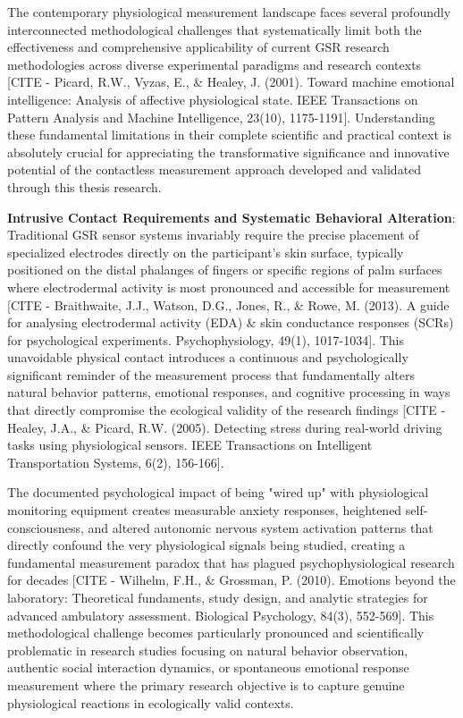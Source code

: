 \documentclass[11pt,a4paper]{report}
\begin{document}
The contemporary physiological measurement landscape faces several profoundly interconnected methodological challenges
that systematically limit both the effectiveness and comprehensive applicability of current GSR research methodologies
across diverse experimental paradigms and research
contexts [CITE - Picard, R.W., Vyzas, E., \& Healey, J. (2001). Toward machine emotional intelligence: Analysis of affective physiological state. IEEE Transactions on Pattern Analysis and Machine Intelligence, 23(10), 1175-1191].
Understanding these fundamental limitations in their complete scientific and practical context is absolutely crucial for
appreciating the transformative significance and innovative potential of the contactless measurement approach developed
and validated through this thesis research.

\textbf{Intrusive Contact Requirements and Systematic Behavioral Alteration}: Traditional GSR sensor systems invariably
require the precise placement of specialized electrodes directly on the participant's skin surface, typically positioned
on the distal phalanges of fingers or specific regions of palm surfaces where electrodermal activity is most pronounced
and accessible for
measurement [CITE - Braithwaite, J.J., Watson, D.G., Jones, R., \& Rowe, M. (2013). A guide for analysing electrodermal activity (EDA) \& skin conductance responses (SCRs) for psychological experiments. Psychophysiology, 49(1), 1017-1034].
This unavoidable physical contact introduces a continuous and psychologically significant reminder of the measurement
process that fundamentally alters natural behavior patterns, emotional responses, and cognitive processing in ways that
directly compromise the ecological validity of the research
findings [CITE - Healey, J.A., \& Picard, R.W. (2005). Detecting stress during real-world driving tasks using physiological sensors. IEEE Transactions on Intelligent Transportation Systems, 6(2), 156-166].

The documented psychological impact of being "wired up" with physiological monitoring equipment creates measurable
anxiety responses, heightened self-consciousness, and altered autonomic nervous system activation patterns that directly
confound the very physiological signals being studied, creating a fundamental measurement paradox that has plagued
psychophysiological research for
decades [CITE - Wilhelm, F.H., \& Grossman, P. (2010). Emotions beyond the laboratory: Theoretical fundaments, study design, and analytic strategies for advanced ambulatory assessment. Biological Psychology, 84(3), 552-569].
This methodological challenge becomes particularly pronounced and scientifically problematic in research studies
focusing on natural behavior observation, authentic social interaction dynamics, or spontaneous emotional response
measurement where the primary research objective is to capture genuine physiological reactions in ecologically valid
contexts.
\end{document}

